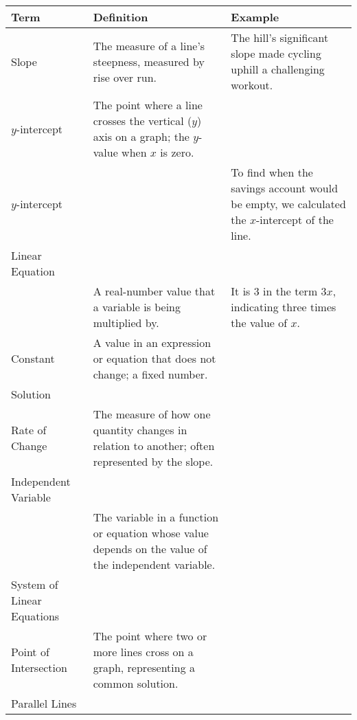 \documentclass{article}
\begin{document}
\begin{tabularx}{\textwidth}{|l|X|X|}
\hline
\textbf{Term} & \textbf{Definition} & \textbf{Example}\\
\hline
Slope & The measure of a line's steepness, measured by rise over run. & The hill's significant slope made cycling uphill a challenging workout. \\[.5in]
\hline
$y$-intercept & The point where a line crosses the vertical ($y$) axis on a graph; the $y$-value when $x$ is zero. & \\[.5in]
\hline
$y$-intercept & & To find when the savings account would be empty, we calculated the $x$-intercept of the line. \\[.5in]
\hline
Linear Equation & & \\[.5in]
\hline
 & A real-number value that a variable is being multiplied by. & It is 3 in the term $3x$, indicating three times the value of $x$. \\[.5in]
\hline
Constant & A value in an expression or equation that does not change; a fixed number. & \\[.5in]
\hline
Solution & & \\[.5in]
\hline
Rate of Change & The measure of how one quantity changes in relation to another; often represented by the slope. & \\[.5in]
\hline
Independent Variable & & \\[.5in]
\hline
 & The variable in a function or equation whose value depends on the value of the independent variable. & \\[.5in]
\hline
System of Linear Equations & & \\[.5in]
\hline
Point of Intersection & The point where two or more lines cross on a graph, representing a common solution. & \\[.5in]
\hline
Parallel Lines & & \\[.5in]
\hline
\end{tabularx}
\end{document}
